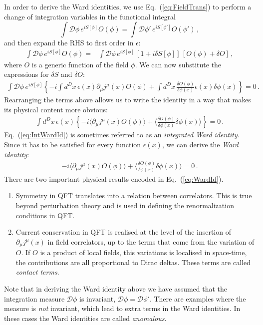 \documentclass[notes]{subfiles}
\begin{document}
In order to derive the Ward identities, we use
Eq.~(\ref{eq:FieldTrans}) to perform a change of integration variables
in the functional integral
\begin{equation}
  \label{eq:ChangeOfVars}
  \int \mathcal{D}\phi\, e^{iS[\phi]} O(\phi) = 
  \int \mathcal{D}\phi'\, e^{iS[\phi']} O(\phi') \, ,
\end{equation}
and then expand the RHS to first order in $\epsilon$:
\begin{align}
  \int \mathcal{D}\phi\, e^{iS[\phi]} O(\phi) 
  =& \int \mathcal{D}\phi\, e^{iS[\phi]}\, 
     \left[
     1 + i \delta S[\phi]
     \right]\, 
     \left[
     O(\phi) + \delta O
     \right]
     \, ,
\end{align}
where $O$ is a generic function of the field $\phi$. We can now
substitute the expressions for $\delta S$ and $\delta O$:
\begin{align}
  \int \mathcal{D}\phi\, e^{iS[\phi]} \left\{
  -i \int d^Dx\, \epsilon(x) \partial_\mu j^\mu(x)
  O(\phi) + \int d^Dx\, \frac{\delta O(\phi)}{\delta\phi(x)} \epsilon(x)
  \delta \phi(x)
  \right\} = 0\, .
\end{align}
Rearranging the terms above allows us to write the identity in a way
that makes its physical content more obvious: 
\begin{align}
  \label{eq:IntWardId}
  \int d^Dx\, \epsilon(x) \left\{
  -i \langle \partial_\mu j^\mu(x)
  O(\phi) \rangle +  
  \langle \frac{\delta O(\phi)}{\delta\phi(x)}
  \delta \phi(x) \rangle \right\} = 0\, .
\end{align}
Eq.~(\ref{eq:IntWardId}) is sometimes referred to as an {\em
  integrated Ward identity}. Since it has to be satisfied for every
function $\epsilon(x)$, we can derive the \emph{Ward identity}:
\begin{align}
  \label{eq:WardId}
   -i \langle \partial_\mu j^\mu(x)
  O(\phi) \rangle +  
  \langle \frac{\delta O(\phi)}{\delta\phi(x)}
  \delta \phi(x) \rangle = 0\, .
\end{align}
There are two important physical results encoded in Eq.~(\ref{eq:WardId}).
\begin{enumerate}
\item Symmetry in QFT translates into a relation between
  correlators. This is true beyond perturbation theory and is used in
  defining the renormalization conditions in QFT.
\item Current conservation in QFT is realised at the level of the
  insertion of $\partial_\mu j^\mu(x)$ in field correlators, up to
  the terms that come from the variation of $O$. If $O$ is a product
  of local fields, this variations is localised in space-time, \ie the
  contributions are all proportional to Dirac deltas. These terms are
  called \emph{contact terms}.  
\end{enumerate}

Note that in deriving the Ward identity above we have assumed that the
integration measure $\mathcal{D}\phi$ is invariant, \ie
$\mathcal{D}\phi=\mathcal{D}\phi'$. There are examples where the
measure is \emph{not} invariant, which lead to extra terms in the Ward
identities. In these cases the Ward identities are called {\em
  anomalous}. 
\end{document}
